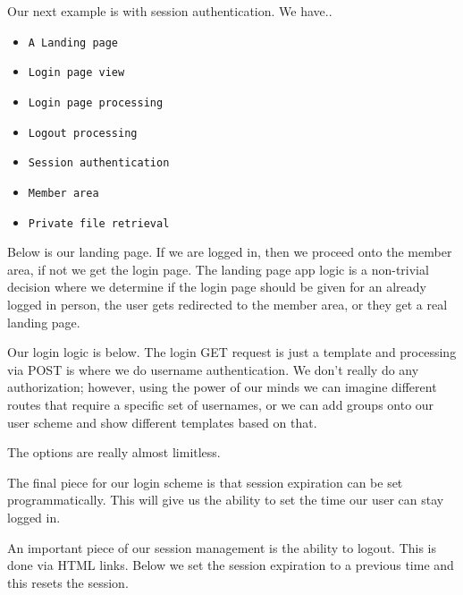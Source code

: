 \documentclass[14pt]{extreport}
\begin{document}
Our next example is with session authentication.  We have..

\begin{itemize} \itemsep1pt \parskip0pt 
\item \verb|A Landing page|
\item \verb|Login page view|
\item \verb|Login page processing|
\item \verb|Logout processing|
\item \verb|Session authentication|
\item \verb|Member area|
\item \verb|Private file retrieval|
\end{itemize}

Below is our landing page.  If we are logged in, then we proceed onto the
member area, if not we get the login page.  The landing page app logic is a
non-trivial decision where we determine if the login page should be given for
an already logged in person, the user gets redirected to the member area, or
they get a real landing page.



Our login logic is below.  The login GET request is just a template and
processing via POST is where we do username authentication.  We don't really do
any authorization; however, using the power of our minds we can imagine
different routes that require a specific set of usernames, or we can add groups
onto our user scheme and show different templates based on that.

\clearpage

The options are really almost limitless.



The final piece for our login scheme is that session expiration can be set
programmatically.  This will give us the ability to set the time our user can
stay logged in.

An important piece of our session management is the ability to logout.  This is
done via HTML links.  Below we set the session expiration to a previous time
and this resets the session.

\clearpage


\end{document}
